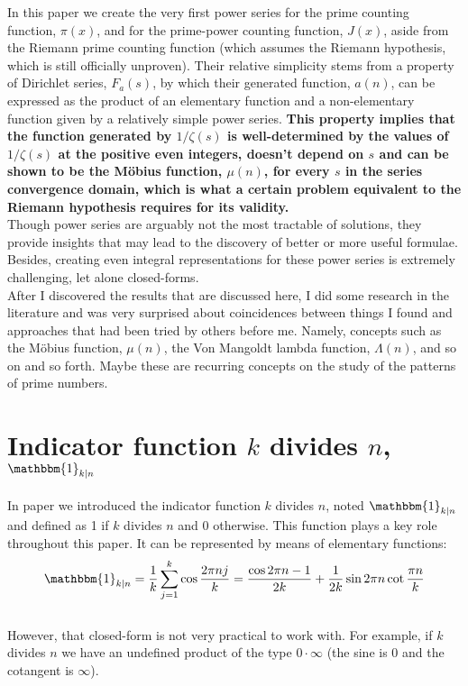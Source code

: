 \documentclass[12pt]{article}
\newcommand*{\citena}[1]{%
\begingroup
[\color{Green}
\romannumeral-`\x %
\setcitestyle{numbers}%
\cite{#1}%
\endgroup
]\ignorespacesafterend
}
\begin{document}
In this paper we create the very first power series for the prime counting function, $\pi(x)$, and for the prime-power counting function, $J(x)$, aside from the Riemann prime counting function (which assumes the Riemann hypothesis, which is still officially unproven). Their relative simplicity stems from a property of Dirichlet series, $F_a(s)$, by which their generated function, $a(n)$, can be expressed as the product of an elementary function and a non-elementary function given by a relatively simple power series. \textbf{This property implies that the function generated by $1/\zeta(s)$ is well-determined by the values of $1/\zeta(s)$ at the positive even integers, doesn't depend on $s$ and can be shown to be the M\"{o}bius function, $\mu(n)$, for every $s$ in the series convergence domain, which is what a certain problem equivalent to the Riemann hypothesis requires for its validity.}\\

Though power series are arguably not the most tractable of solutions, they provide insights that may lead to the discovery of better or more useful formulae. Besides, creating even integral representations for these power series is extremely challenging, let alone closed-forms.\\

After I discovered the results that are discussed here, I did some research in the literature and was very surprised about coincidences between things I found and approaches that had been tried by others before me. Namely, concepts such as the M\"{o}bius function, $\mu(n)$, the Von Mangoldt lambda function, $\Lambda(n)$, and so on and so forth. Maybe these are recurring concepts on the study of the patterns of prime numbers.

\section{Indicator function $k$ divides $n$, $\mathbbm{1}_{k|n}$}
In paper \citena{GHN} we introduced the indicator function $k$ divides $n$, noted $\mathbbm{1}_{k|n}$ and defined as 1 if $k$ divides $n$ and 0 otherwise. This function plays a key role throughout this paper. It can be represented by means of elementary functions:
\begin{equation} \label{eq:k_div_n} \nonumber
\mathbbm{1}_{k|n}=\frac{1}{k}\sum_{j=1}^{k}\cos{\frac{2\pi nj}{k}}=\frac{\cos{2\pi n}-1}{2k}+\frac{1}{2k}\sin{2\pi n}\cot{\frac{\pi n}{k}}
\end{equation}\\
\indent However, that closed-form is not very practical to work with. For example, if $k$ divides $n$ we have an undefined product of the type $0\cdot\infty$ (the sine is 0 and the cotangent is $\infty$).\\
\end{document}
